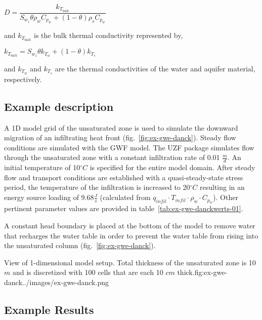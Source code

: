 \bigskip
$D=\dfrac{k_{T_{bulk}}}{S_{w_z} \theta \rho_w C_{p_w} + \left(1 - \theta \right) \rho_s C_{p_w}}$
\bigskip

\noindent and $k_{T_{bulk}}$ is the bulk thermal conductivity represented by,

\bigskip
$k_{T_{bulk}} = S_{w_z} \theta k_{T_w} + \left(1-\theta \right) k_{T_s}$
\bigskip

\noindent and $k_{T_w}$ and $k_{T_s}$ are the thermal conductivities of the water and aquifer material, respectively.

\subsection{Example description}

A 1D model grid of the unsaturated zone is used to simulate the downward migration of an infiltrating heat front ({fig.~\ref{fig:ex-gwe-danck}}).  Steady flow conditions are simulated with the GWF model.  The UZF package simulates flow through the unsaturated zone with a constant infiltration rate of 0.01 $\frac{m}{d}$. An initial temperature of 10$^{\circ}C$ is specified for the entire model domain.  After steady flow and transport conditions are established with a quasi-steady-state stress period, the temperature of the infiltration is increased to 20$^{\circ}C$ resulting in an energy source loading of 9.68$\frac{J}{s}$ (calculated from $q_{infil} \cdot T_{infil} \cdot \rho_w \cdot C_{p_w}$). Other pertinent parameter values are provided in table~\ref{tab:ex-gwe-danckwerts-01}. 

A constant head boundary is placed at the bottom of the model to remove water that recharges the water table in order to prevent the water table from rising into the unsaturated column ({fig.~\ref{fig:ex-gwe-danck}}).

\begin{StandardFigure}{
   View of 1-dimensional model setup. Total thickness of the unsaturated zone is 10 $m$ and is discretized with 100 cells that are each 10 $cm$ thick.}{fig:ex-gwe-danck}{../images/ex-gwe-danck.png}
\end{StandardFigure}



\subsection{Example Results}

